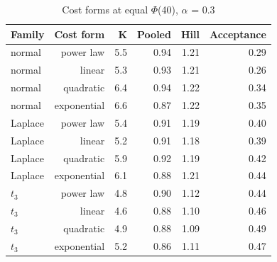 \begin{table}[htbp]
\centering
\caption{Cost forms at equal $\Phi$(40), $\alpha$ = 0.3}
\label{tab:a10_cost_forms}
\small
\begin{tabular}{lrrrrr}
\toprule
Family & Cost form & K & Pooled & Hill & Acceptance \\
\midrule
normal & power law & 5.5 & 0.94 & 1.21 & 0.29 \\
normal & linear & 5.3 & 0.93 & 1.21 & 0.26 \\
normal & quadratic & 6.4 & 0.94 & 1.22 & 0.34 \\
normal & exponential & 6.6 & 0.87 & 1.22 & 0.35 \\
Laplace & power law & 5.4 & 0.91 & 1.19 & 0.40 \\
Laplace & linear & 5.2 & 0.91 & 1.18 & 0.39 \\
Laplace & quadratic & 5.9 & 0.92 & 1.19 & 0.42 \\
Laplace & exponential & 6.1 & 0.88 & 1.21 & 0.44 \\
$t_3$ & power law & 4.8 & 0.90 & 1.12 & 0.44 \\
$t_3$ & linear & 4.6 & 0.88 & 1.10 & 0.46 \\
$t_3$ & quadratic & 4.9 & 0.88 & 1.09 & 0.49 \\
$t_3$ & exponential & 5.2 & 0.86 & 1.11 & 0.47 \\
\bottomrule
\end{tabular}
\end{table}
